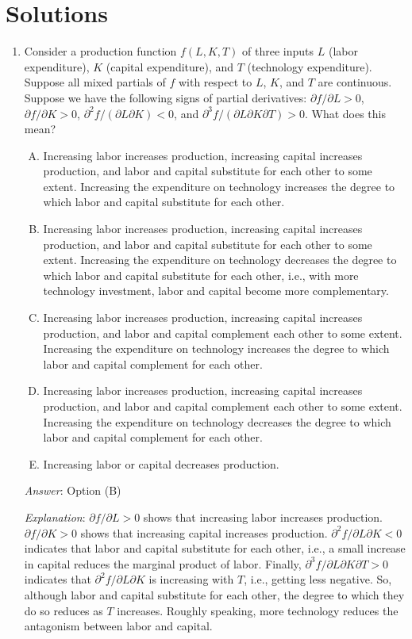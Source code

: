 \documentclass[10pt]{amsart}
\begin{document}
\section{Solutions}
\begin{enumerate}

\item Consider a production function $f(L,K,T)$ of three inputs $L$
  (labor expenditure), $K$ (capital expenditure), and $T$ (technology
  expenditure). Suppose all mixed partials of $f$ with respect to $L$,
  $K$, and $T$ are continuous. Suppose we have the following signs of
  partial derivatives: $\partial f/\partial L > 0$, $\partial
  f/\partial K > 0$, $\partial^2f/(\partial L \partial K) < 0$, and
  $\partial^3f/(\partial L\partial K \partial T) > 0$. What does this
  mean?

  \begin{enumerate}[(A)]
  \item Increasing labor increases production, increasing capital
    increases production, and labor and capital substitute for each
    other to some extent. Increasing the expenditure on technology
    increases the degree to which labor and capital substitute for
    each other.
  \item Increasing labor increases production, increasing capital
    increases production, and labor and capital substitute for each
    other to some extent. Increasing the expenditure on technology
    decreases the degree to which labor and capital substitute for
    each other, i.e., with more technology investment, labor and
    capital become more complementary.
  \item Increasing labor increases production, increasing capital
    increases production, and labor and capital complement each other
    to some extent. Increasing the expenditure on technology increases
    the degree to which labor and capital complement for each other.
  \item Increasing labor increases production, increasing capital
    increases production, and labor and capital complement each other
    to some extent. Increasing the expenditure on technology decreases
    the degree to which labor and capital complement for each other.
  \item Increasing labor or capital decreases production.
  \end{enumerate}

  {\em Answer}: Option (B)

  {\em Explanation}: $\partial f/\partial L > 0$ shows that increasing
  labor increases production. $\partial f/\partial K > 0$ shows that
  increasing capital increases production. $\partial^2f/\partial L
  \partial K < 0$ indicates that labor and capital substitute for each
  other, i.e., a small increase in capital reduces the marginal
  product of labor. Finally, $\partial^3f/\partial L\partial K
  \partial T > 0$ indicates that $\partial^2f/\partial L \partial K$
  is increasing with $T$, i.e., getting less negative. So, although
  labor and capital substitute for each other, the degree to which
  they do so reduces as $T$ increases. Roughly speaking, more
  technology reduces the antagonism between labor and capital.


\end{enumerate}
\end{document}
